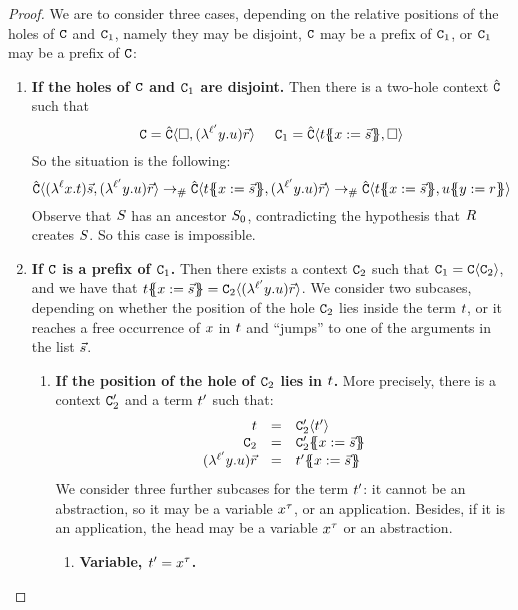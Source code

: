 \begin{proof}
We are to consider three cases, depending on the relative positions of the holes of $\mathtt{C}$ and $\mathtt{C}_1$,
namely they may be disjoint,
$\mathtt{C}$ may be a prefix of $\mathtt{C}_1$,
or $\mathtt{C}_1$ may be a prefix of $\mathtt{C}$:
\begin{enumerate}
\item {\bf If the holes of $\mathtt{C}$ and $\mathtt{C}_1$ are disjoint.}
  Then there is a two-hole context $\hat{\mathtt{C}}$ such that
  \[
    \mathtt{C} = \hat{\mathtt{C}}\langle\Box,(\lambda^{\ell'} y. u)\vec{r}\rangle
    \hspace{.5cm}
    \mathtt{C}_1 = \hat{\mathtt{C}}\langle t\{\!\!\{x := \vec{s}\}\!\!\},\Box\rangle
  \]
  So the situation is the following:
  \[
    \conhat\of{(\lamp{\lab}{\var}{\tm})\ls{\tmtwo},(\lamp{\labtwo}{\vartwo}{\tmthree})\ls{\tmfour}}
    \todist \conhat\of{\tm\sub{\var}{\ls{\tmtwo}},(\lamp{\labtwo}{\vartwo}{\tmthree})\ls{\tmfour}}
    \todist \conhat\of{\tm\sub{\var}{\ls{\tmtwo}},\tmthree\sub{\vartwo}{\tmfour}}
  \]
  Observe that $S$ has an ancestor $S_0$, contradicting the hypothesis that $R$ creates $S$.
  So this case is impossible.
\item {\bf If $\mathtt{C}$ is a prefix of $\mathtt{C}_1$.}
  Then there exists a context $\mathtt{C}_2$ such that $\mathtt{C}_1 = \mathtt{C}\langle\mathtt{C}_2\rangle$,
  and we have that
  $t\{\!\!\{x := \vec{s}\}\!\!\} = \mathtt{C}_2\langle(\lambda^{\ell'} y. u)\vec{r}\rangle$.
  We consider two subcases, depending on whether the position of the hole $\mathtt{C}_2$ lies
  inside the term $t$, or it reaches a free occurrence of $x$ in $t$
  and ``jumps'' to one of the arguments in the list $\vec{s}$.
  \begin{enumerate}
  \item {\bf If the position of the hole of $\mathtt{C}_2$ lies in $t$.}
    More precisely, there is a context $\mathtt{C}'_2$ and a term $t'$ such that:
    \[
      \begin{array}{rcl}
      \tm & = & \con'_2\of{\tm'} \\
      \con_2 & = & \con'_2\sub{\var}{\ls{\tmtwo}} \\
      (\lamp{\labtwo}{\vartwo}{\tmthree})\ls{\tmfour} & = & \tm'\sub{\var}{\ls{\tmtwo}}
      \end{array}
    \]
    We consider three further subcases for the term $t'$:
    it cannot be an abstraction, so it may be a variable $x^{\tau}$,
    or an application.
    Besides, if it is an application, the head may be a variable $x^{\tau}$ or an abstraction.
    \begin{enumerate}
    \item {\bf Variable, \ie $t' = x^{\tau}$.}

\end{enumerate}
\end{enumerate}
\end{enumerate}
\end{proof}
